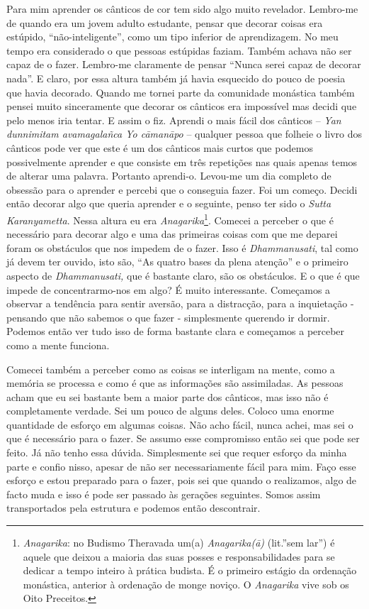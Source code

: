 Para mim aprender os cânticos de cor tem sido algo muito revelador.
Lembro-me de quando era um jovem adulto estudante, pensar que decorar
coisas era estúpido, ``não-inteligente'', como um tipo inferior de
aprendizagem. No meu tempo era considerado o que pessoas estúpidas
faziam. Também achava não ser capaz de o fazer. Lembro-me claramente de
pensar ``Nunca serei capaz de decorar nada''. E claro, por essa altura
também já havia esquecido do pouco de poesia que havia decorado. Quando
me tornei parte da comunidade monástica também pensei muito sinceramente
que decorar os cânticos era impossível mas decidi que pelo menos iria
tentar. E assim o fiz. Aprendi o mais fácil dos cânticos -- \emph{Yan
dunnimitam avamagalañca Yo cāmanāpo} -- qualquer pessoa que folheie o
livro dos cânticos pode ver que este é um dos cânticos mais curtos que
podemos possivelmente aprender e que consiste em três repetições nas
quais apenas temos de alterar uma palavra. Portanto aprendi-o. Levou-me
um dia completo de obsessão para o aprender e percebi que o conseguia
fazer. Foi um começo. Decidi então decorar algo que queria aprender e o
seguinte, penso ter sido o \emph{Sutta Karanyametta}. Nessa altura eu
era \emph{Anagarika}\footnote{%
  \emph{Anagarika}: no Budismo Theravada um(a) \emph{Anagarika(ā)}
  (lit.''sem lar'') é aquele que deixou a maioria das suas posses e
  responsabilidades para se dedicar a tempo inteiro à prática budista. É o
  primeiro estágio da ordenação monástica, anterior à ordenação de monge
  noviço. O \emph{Anagarika} vive sob os Oito Preceitos.
}.
Comecei a perceber o que é necessário para
decorar algo e uma das primeiras coisas com que me deparei foram os
obstáculos que nos impedem de o fazer. Isso é \emph{Dhammanusati}, tal
como já devem ter ouvido, isto são, ``As quatro bases da plena atenção''
e o primeiro aspecto de \emph{Dhammanusati,} que é bastante claro, são
os obstáculos. E o que é que impede de concentrarmo-nos em algo? É muito
interessante. Começamos a observar a tendência para sentir aversão, para
a distracção, para a inquietação - pensando que não sabemos o que fazer
- simplesmente querendo ir dormir. Podemos então ver tudo isso de forma
bastante clara e começamos a perceber como a mente funciona.

Comecei também a perceber como as coisas se interligam na mente, como a
memória se processa e como é que as informações são assimiladas. As
pessoas acham que eu sei bastante bem a maior parte dos cânticos, mas
isso não é completamente verdade. Sei um pouco de alguns deles. Coloco
uma enorme quantidade de esforço em algumas coisas. Não acho fácil,
nunca achei, mas sei o que é necessário para o fazer. Se assumo esse
compromisso então sei que pode ser feito. Já não tenho essa dúvida.
Simplesmente sei que requer esforço da minha parte e confio nisso,
apesar de não ser necessariamente fácil para mim. Faço esse esforço e
estou preparado para o fazer, pois sei que quando o realizamos, algo de
facto muda e isso é pode ser passado às gerações seguintes. Somos assim
transportados pela estrutura e podemos então descontrair.

